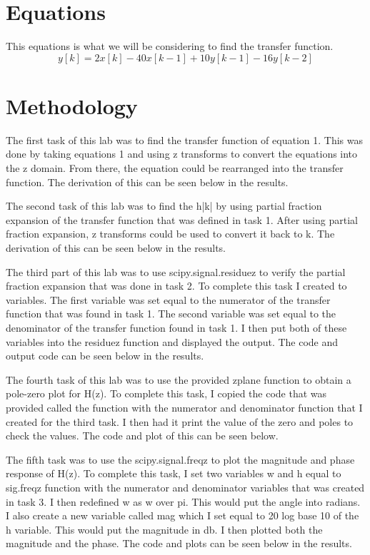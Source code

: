 \documentclass[11pt,a4]{report}
\begin{document}
\section{Equations}
This equations is what we will be considering to find the transfer function. 
\begin{equation}
    y[k] = 2x[k]- 40x[k-1]+10y[k-1]-16y[k-2]
\end{equation}

\section{Methodology}
The first task of this lab was to find the transfer function of equation 1. This was done by taking equations 1 and using z transforms to convert the equations into the z domain. From there, the equation could be rearranged into the transfer function. The derivation of this can be seen below in the results. 

The second task of this lab was to find the h|k| by using partial fraction expansion of the transfer function that was defined in task 1. After using partial fraction expansion, z transforms could be used to convert it back to k. The derivation of this can be seen below in the results. 

The third part of this lab was to use scipy.signal.residuez to verify the partial fraction expansion that was done in task 2. To complete this task I created to variables. The first variable was set equal to the numerator of the transfer function that was found in task 1. The second variable was set equal to the denominator of the transfer function found in task 1. I then put both of these variables into the residuez function and displayed the output. The code and output code can be seen below in the results. 

The fourth task of this lab was to use the provided zplane function to obtain a pole-zero plot for H(z). To complete this task, I copied the code that was provided called the function with the numerator and denominator function that I created for the third task. I then had it print the value of the zero and poles to check the values. The code and plot of this can be seen below. 

The fifth task was to use the scipy.signal.freqz to plot the magnitude and phase response of H(z). To complete this task, I set two variables w and h equal to sig.freqz function with the numerator and denominator variables that was created in task 3. I then redefined w as w over pi. This would put the angle into radians. I also create a new variable called mag which I set equal to 20 log base 10 of the h variable. This would put the magnitude in db. I then plotted both the magnitude and the phase. The code and plots can be seen below in the results. 
\end{document}
